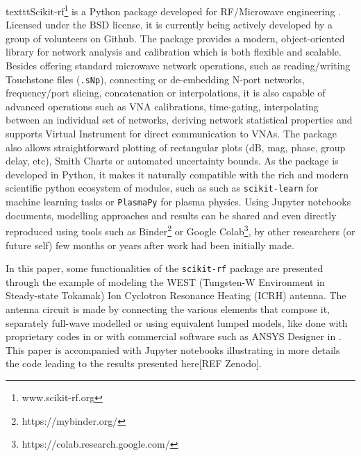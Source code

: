 \documentclass{aip-cp}
\begin{document}
texttt{Scikit-rf}\footnote{www.scikit-rf.org} is a Python package developed for RF/Microwave engineering  \cite{Arsenovic2018}. Licensed under the BSD license, it is currently being actively developed by a group of volunteers on Github. The package provides a modern, object-oriented library for network analysis and calibration which is both flexible and scalable. Besides offering standard microwave network operations, such as reading/writing Touchstone files (\texttt{.sNp}), connecting or de-embedding N-port networks, frequency/port slicing, concatenation or interpolations, it is also capable of advanced operations such as VNA calibrations, time-gating, interpolating between an individual set of networks, deriving network statistical properties and supports Virtual Instrument for direct communication to VNAs. The package also allows straightforward plotting of rectangular plots (dB, mag, phase, group delay, etc), Smith Charts or automated uncertainty bounds. As the package is developed in Python, it makes it naturally compatible with the rich and modern scientific python ecosystem of modules\cite{Millman2011}, such as such as \texttt{scikit-learn} for machine learning tasks or \texttt{PlasmaPy} \cite{PlasmaPyCommunity2018} for plasma physics. Using Jupyter notebooks documents\cite{Kluyver2016}, modelling approaches and results can be shared and even directly reproduced using tools such as Binder\footnote{https://mybinder.org/} or Google Colab\footnote{https://colab.research.google.com/}, by other researchers (or future self) few months or years after work had been initially made.

In this paper, some functionalities of the \texttt{scikit-rf} package are presented through the example of modeling the WEST (Tungsten-W Environment in Steady-state Tokamak) Ion Cyclotron Resonance Heating (ICRH) antenna. The antenna circuit is made by connecting the various elements that compose it, separately full-wave modelled or using equivalent lumped models, like done with proprietary codes in \cite{Durodie2015, Helou2015, Helou2015a} or with commercial software such as ANSYS Designer in \cite{Hillairet2015}. This paper is accompanied with Jupyter notebooks illustrating in more details the code leading to the results presented here[REF Zenodo].



\end{document}
